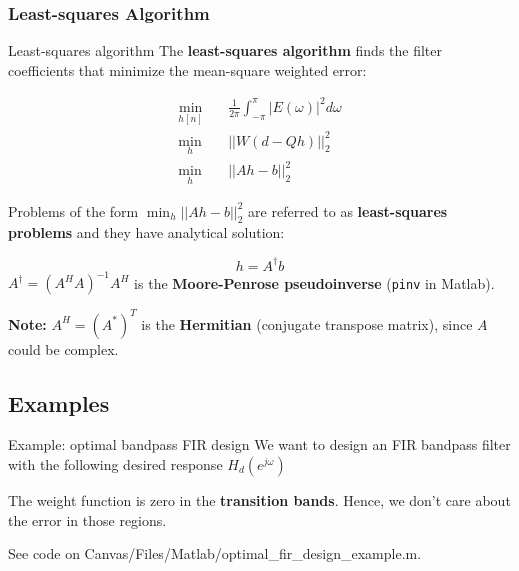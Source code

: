 \documentclass[10pt]{beamer}
\begin{document}
\subsubsection{Least-squares Algorithm}
\begin{frame}{Least-squares algorithm}
The \textbf{least-squares algorithm} finds the filter coefficients that minimize the mean-square weighted error:

\begin{align*}
\min_{h[n]} \quad&\frac{1}{2\pi}\int_{-\pi}^{\pi} |E(\omega)|^2d\omega \tag{mean square weighted error}\\
\min_{h}\quad &||W(d - Qh)||_2^2 \tag{in matrix notation} \\
\min_{h} \quad&||Ah - b||_2^2 \tag{change of variables $A = WQ$ and $b = Wd$}
\end{align*}

Problems of the form $\min_h ||Ah - b||_2^2$ are referred to as \textbf{least-squares problems} and they have analytical solution:

\begin{equation*}
	h = A^\dagger b \tag{least-squares solution}
\end{equation*}
$A^\dagger = (A^HA)^{-1}A^H$ is the \textbf{Moore-Penrose pseudoinverse} (\texttt{pinv} in Matlab). 

\textbf{Note:} $A^H = (A^*)^T$ is the \textbf{Hermitian} (conjugate transpose matrix), since $A$ could be complex.
\end{frame}

%
\subsection{Examples}
\begin{frame}{Example: optimal bandpass FIR design}
	We want to design an FIR bandpass filter with the following desired response $H_d(e^{j\omega})$

	The weight function is zero in the {\color{red!50} \textbf{transition bands}}. Hence, we don't care about the error in those regions.
	
	\begin{center}
		\resizebox{0.7\textwidth}{!}{}
	\end{center}
	
	See code on Canvas/Files/Matlab/optimal\_fir\_design\_example.m.
\end{frame}
\end{document}
